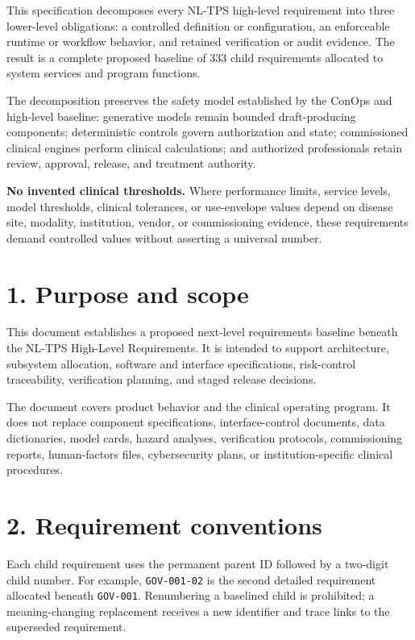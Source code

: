 \documentclass[11pt,letterpaper]{article}
\begin{document}

This specification decomposes every NL-TPS high-level requirement into three lower-level obligations: a controlled definition or configuration, an enforceable runtime or workflow behavior, and retained verification or audit evidence. The result is a complete proposed baseline of 333 child requirements allocated to system services and program functions.

The decomposition preserves the safety model established by the ConOps and high-level baseline: generative models remain bounded draft-producing components; deterministic controls govern authorization and state; commissioned clinical engines perform clinical calculations; and authorized professionals retain review, approval, release, and treatment authority.

\textbf{No invented clinical thresholds. }Where performance limits, service levels, model thresholds, clinical tolerances, or use-envelope values depend on disease site, modality, institution, vendor, or commissioning evidence, these requirements demand controlled values without asserting a universal number.

\section{1. Purpose and scope}

This document establishes a proposed next-level requirements baseline beneath the NL-TPS High-Level Requirements. It is intended to support architecture, subsystem allocation, software and interface specifications, risk-control traceability, verification planning, and staged release decisions.

The document covers product behavior and the clinical operating program. It does not replace component specifications, interface-control documents, data dictionaries, model cards, hazard analyses, verification protocols, commissioning reports, human-factors files, cybersecurity plans, or institution-specific clinical procedures.

\section{2. Requirement conventions}

Each child requirement uses the permanent parent ID followed by a two-digit child number. For example, \texttt{GOV-001-02} is the second detailed requirement allocated beneath \texttt{GOV-001}. Renumbering a baselined child is prohibited; a meaning-changing replacement receives a new identifier and trace links to the superseded requirement.
\end{document}
